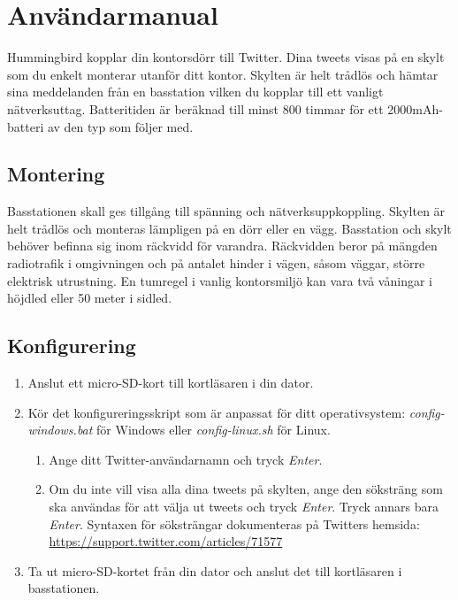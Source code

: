 \documentclass[a4paper,11pt]{article}
\begin{document}
\section{Användarmanual}
\label{sec:manual}

Hummingbird kopplar din kontorsdörr till Twitter. Dina tweets visas på en skylt som du enkelt monterar utanför ditt kontor. Skylten är helt trådlös och hämtar sina meddelanden från en basstation vilken du kopplar till ett vanligt nätverksuttag. Batteritiden är beräknad till minst 800 timmar för ett 2000mAh-batteri av den typ som följer med.

\subsection{Montering}
Basstationen skall ges tillgång till spänning och nätverksuppkoppling. Skylten är helt trådlös och monteras lämpligen på en dörr eller en vägg. Basstation och skylt behöver befinna sig inom räckvidd för varandra. Räckvidden beror på mängden radiotrafik i omgivningen och på antalet hinder i vägen, såsom väggar, större elektrisk utrustning. En tumregel i vanlig kontorsmiljö kan vara två våningar i höjdled eller 50 meter i sidled.

\subsection{Konfigurering}

\begin{enumerate}
    \item Anslut ett micro-SD-kort till kortläsaren i din dator.
    \item Kör det konfigureringsskript som är anpassat för ditt operativsystem: {\it config-windows.bat} för Windows eller {\it config-linux.sh} för Linux.
    \begin{enumerate}
        \item Ange ditt Twitter-användarnamn och tryck {\it Enter}.
        \item Om du inte vill visa alla dina tweets på skylten, ange den söksträng som ska användas för att välja ut tweets och tryck {\it Enter}. Tryck annars bara {\it Enter}. Syntaxen för söksträngar dokumenteras på Twitters hemsida: \url{https://support.twitter.com/articles/71577}
    \end{enumerate}
    \item Ta ut micro-SD-kortet från din dator och anslut det till kortläsaren i basstationen.
\end{enumerate}
\end{document}
